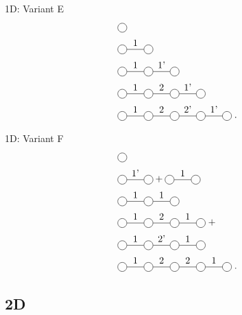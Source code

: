 \begin{frame}{1D: Variant E}
    \begin{subequations}
        \begin{align}
             & \mpob{1}{ {,}  }{}{}{}{{,,}}                          \\
             & \mpob{2}{ {,"1",}  }{}{}{}{{,,}}                      \\
             & \mpob{3}{ {,"1","1'",}  }{}{}{}{{,,,}}                \\
             & \mpob{4}{ {,"1","2","1'",}  }{}{}{}{{,,,,,}}          \\
             & \mpob{5}{ {,"1","2","2'","1'",}  }{}{}{}{{,,,,,}} \;.
        \end{align}
    \end{subequations}
\end{frame}

\begin{frame}{1D: Variant F}
    \begin{subequations}
        \begin{align}
             & \mpob{1}{ {,}  }{}{}{}{{,,}}                                         \\
             & \mpob{2}{ {,"1'",}  }{}{}{}{{,,}}+  \mpob{2}{ {,"1",}  }{}{}{}{{,,}} \\
             & \mpob{3}{ {,"1","1",}  }{}{}{}{{,,,}}                                \\
             & \mpob{4}{ {,"1","2","1",}  }{}{}{}{{,,,,,}} \; +  \nonumber          \\
             & \mpob{4}{ {,"1","2'","1",}  }{}{}{}{{,,,,,}}                         \\
             & \mpob{5}{ {,"1","2","2","1",}  }{}{}{}{{,,,,,}} \;.
        \end{align}
    \end{subequations}
\end{frame}

\subsection{2D}

